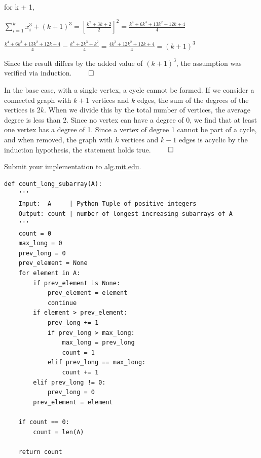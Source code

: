\documentclass[12pt,twoside]{article}
\begin{document}
\begin{problems}
for k + 1,

$\sum_{i=1}^{k} x_i^3 + (k+1)^3 = [\frac{k^2 + 3k + 2}{2}]^2 = \frac{k^4 + 6k^3 + 13k^2 + 12k + 4}{4}$

$\frac{k^4 + 6k^3 + 13k^2 + 12k + 4}{4} - \frac{k^4 + 2k^3 + k^2}{4} = \frac{4k^3 + 12k^2 + 12k + 4}{4} = (k+1)^3$

Since the result differs by the added value of $(k+1)^3$, the assumption was verified via induction. 
$\qed$
\newpage
\problem  %

In the base case, with a single vertex, a cycle cannot be formed. If we consider a connected graph with $k + 1$ vertices and $k$ edges, the sum of the degrees of the vertices is $2k$. 
When we divide this by the total number of vertices, the average degree is less than 2. Since no vertex can have a degree of 0, we find that at least one vertex has a degree of 1. 
Since a vertex of degree 1 cannot be part of a cycle, and when removed, the graph with $k$ vertices and $k-1$ edges is acyclic by the induction hypothesis, the statement holds true.
$\qed$

\vfill
\problem  %
Submit your implementation to {\small\url{alg.mit.edu}}.

\begin{lstlisting}
def count_long_subarray(A):
    '''
    Input:  A     | Python Tuple of positive integers
    Output: count | number of longest increasing subarrays of A
    '''
    count = 0
    max_long = 0
    prev_long = 0
    prev_element = None
    for element in A:
        if prev_element is None:
            prev_element = element
            continue
        if element > prev_element:
            prev_long += 1
            if prev_long > max_long:
                max_long = prev_long
                count = 1
            elif prev_long == max_long:
                count += 1
        elif prev_long != 0:
            prev_long = 0
        prev_element = element

    if count == 0:
        count = len(A)
            
    return count

\end{lstlisting}

\end{problems}
\end{document}
